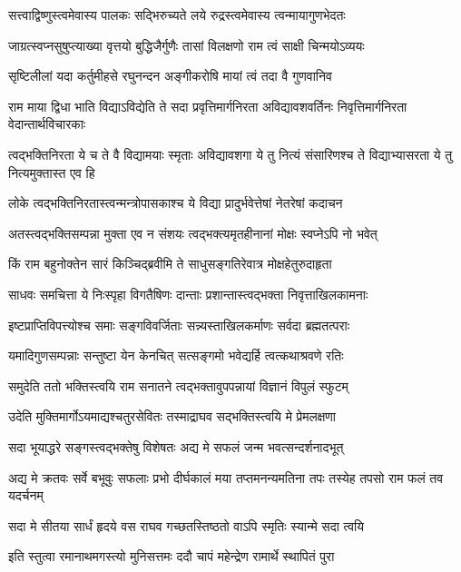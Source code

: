 \twolineshloka
{सत्त्वाद्विष्णुस्त्वमेवास्य पालकः सद्भिरुच्यते}
{लये रुद्रस्त्वमेवास्य त्वन्मायागुणभेदतः} %

\twolineshloka
{जाग्रत्स्वप्नसुषुप्त्याख्या वृत्तयो बुद्धिजैर्गुणैः}
{तासां विलक्षणो राम त्वं साक्षी चिन्मयोऽव्ययः} %

\twolineshloka
{सृष्टिलीलां यदा कर्तुमीहसे रघुनन्दन}
{अङ्गीकरोषि मायां त्वं तदा वै गुणवानिव} %

\threelineshloka
{राम माया द्विधा भाति विद्याऽविद्येति ते सदा}
{प्रवृत्तिमार्गनिरता अविद्यावशवर्तिनः}
{निवृत्तिमार्गनिरता वेदान्तार्थविचारकाः} %

\threelineshloka
{त्वद्भक्तिनिरता ये च ते वै विद्यामयाः स्मृताः}
{अविद्यावशगा ये तु नित्यं संसारिणश्च ते}
{विद्याभ्यासरता ये तु नित्यमुक्तास्त एव हि} %

\twolineshloka
{लोके त्वद्भक्तिनिरतास्त्वन्मन्त्रोपासकाश्च ये}
{विद्या प्रादुर्भवेत्तेषां नेतरेषां कदाचन} %

\twolineshloka
{अतस्त्वद्भक्तिसम्पन्ना मुक्ता एव न संशयः}
{त्वद्भक्त्यमृतहीनानां मोक्षः स्वप्नेऽपि नो भवेत्} %

\twolineshloka
{किं राम बहुनोक्तेन सारं किञ्चिद्ब्रवीमि ते}
{साधुसङ्गतिरेवात्र मोक्षहेतुरुदाहृता} %

\twolineshloka
{साधवः समचित्ता ये निःस्पृहा विगतैषिणः}
{दान्ताः प्रशान्तास्त्वद्भक्ता निवृत्ताखिलकामनाः} %

\twolineshloka
{इष्टप्राप्तिविपत्त्योश्च समाः सङ्गविवर्जिताः}
{सन्न्यस्ताखिलकर्माणः सर्वदा ब्रह्मतत्पराः} %

\twolineshloka
{यमादिगुणसम्पन्नाः सन्तुष्टा येन केनचित्}
{सत्सङ्गमो भवेद्यर्हि त्वत्कथाश्रवणे रतिः} %

\twolineshloka
{समुदेति ततो भक्तिस्त्वयि राम सनातने}
{त्वद्भक्तावुपपन्नायां विज्ञानं विपुलं स्फुटम्} %

\twolineshloka
{उदेति मुक्तिमार्गोऽयमाद्यश्चतुरसेवितः}
{तस्माद्राघव सद्भक्तिस्त्वयि मे प्रेमलक्षणा} %

\twolineshloka
{सदा भूयाद्धरे सङ्गस्त्वद्भक्तेषु विशेषतः}
{अद्य मे सफलं जन्म भवत्सन्दर्शनादभूत्} %

\threelineshloka
{अद्य मे क्रतवः सर्वे बभूवुः सफलाः प्रभो}
{दीर्घकालं मया तप्तमनन्यमतिना तपः}
{तस्येह तपसो राम फलं तव यदर्चनम्} %

\twolineshloka
{सदा मे सीतया सार्धं हृदये वस राघव}
{गच्छतस्तिष्ठतो वाऽपि स्मृतिः स्यान्मे सदा त्वयि} %

\twolineshloka
{इति स्तुत्वा रमानाथमगस्त्यो मुनिसत्तमः}
{ददौ चापं महेन्द्रेण रामार्थे स्थापितं पुरा} %

